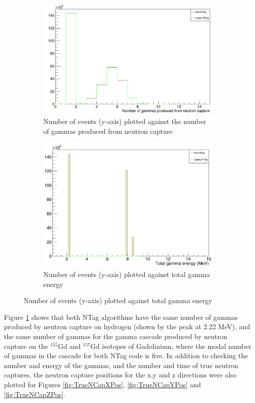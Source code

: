 \begin{figure}
    \centering
     \begin{subfigure}[b]{0.45\linewidth}
      \includegraphics[width=\linewidth]{Figures/NGamma.PNG}
      \caption{Number of events (y-axis) plotted against the number of gammas produced from neutron capture}
      \label{fig:NGamma} 
     \end{subfigure}
     \begin{subfigure}[b]{0.45\linewidth}
       \includegraphics[width=\linewidth]{Figures/TotGammaE.PNG}
        \caption{Number of events (y-axis) plotted against total gamma energy} 
     \label{fig:TotGammaE}
      \end{subfigure} 
\end{figure}

Figure \ref{fig:NGamma} shows that both NTag algorithms have the same number of gammas produced by neutron capture on hydrogen (shown by the peak at 2.22 MeV), and the same number of gammas for the gamma cascade produced by neutron capture on the ${ }^{155} \mathrm{Gd}$ and 
${ }^{157} \mathrm{Gd}$ isotopes of Gadolinium, where the modal number of gammas in the cascade for both NTag code is five. In addition to checking the number and energy of the gammas, and the number and time of true neutron captures, the neutron capture positions for the x,y and z directions were also plotted for Figures \ref{fig:TrueNCapXPos}, \ref{fig:TrueNCapYPos} and \ref{fig:TrueNCapZPos}.


